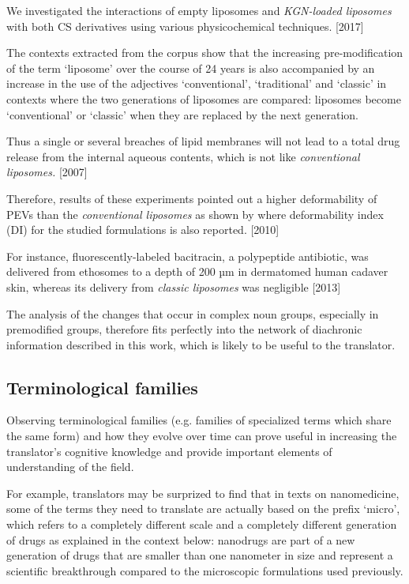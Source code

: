 \documentclass[output=paper]{langscibook}
\begin{document}
\ea%
    \label{ex:key:15}
         We investigated the interactions of empty liposomes and \textit{KGN-loaded liposomes} with both CS derivatives using various physicochemical techniques. [2017]
\z

The contexts extracted from the corpus show that the increasing pre-mod\-i\-fi\-ca\-tion of the term ‘liposome’ over the course of 24 years is also accompanied by an increase in the use of the adjectives ‘conventional’, ‘traditional’ and ‘classic’ in contexts where the two generations of liposomes are compared: liposomes become ‘conventional’ or ‘classic’ when they are replaced by the next generation.

\ea%
    \label{ex:key:16}
         Thus a single or several breaches of lipid membranes will not lead to a total drug release from the internal aqueous contents, which is not like \textit{conventional liposomes.} [2007]
\z

\ea%
    \label{ex:key:17}
         Therefore, results of these experiments pointed out a higher deformability of PEVs than the \textit{conventional liposomes} as shown by  where deformability index (DI) for the studied formulations is also reported. [2010]
\z

\ea%
    \label{ex:key:18}
         For instance, fluorescently-labeled bacitracin, a polypeptide antibiotic, was delivered from ethosomes to a depth of 200 µm in dermatomed human cadaver skin, whereas its delivery from \textit{classic liposomes} was negligible [2013]
\z

The analysis of the changes that occur in complex noun groups, especially in premodified groups, therefore fits perfectly into the network of diachronic information described in this work, which is likely to be useful to the translator.

\subsection{Terminological families}\label{sec:cuchet:3.3}

Observing terminological families (e.g. families of specialized terms which share the same form) and how they evolve over time can prove useful in increasing the translator’s cognitive knowledge and provide important elements of understanding of the field.

For example, translators may be surprized to find that in texts on nanomedicine, some of the terms they need to translate are actually based on the prefix ‘micro’, which refers to a completely different scale and a completely different generation of drugs as explained in the context below: nanodrugs are part of a new generation of drugs that are smaller than one nanometer in size and represent a scientific breakthrough compared to the microscopic formulations used previously.
\end{document}
